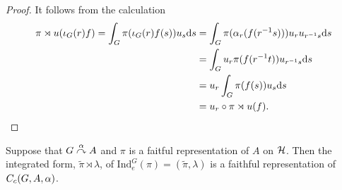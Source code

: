 \begin{proof}
It follows from the calculation
\begin{align*}
\pi \rtimes u (\iota_G(r)f) = \int_G \pi(\iota_G(r) f(s) ) u_s \mathrm{d} s &= \int_G \pi(\alpha_r(f(r^{-1}s))) u_ru_{r^{-1}s} \mathrm{d} s\\
&= \int_G u_r \pi(f(r^{-1}t)) u_{r^{-1}s} \mathrm{d} s \\
&= u_r \int_G  \pi(f(s)) u_s \mathrm{d} s \\
&= u_r \circ \pi \rtimes u (f).
\end{align*}
\end{proof}
\begin{lemma}
Suppose that $G \stackrel{\alpha}{\curvearrowright} A$ and $\pi$ is a faitful representation of $A$ on $\mathcal{H}$. Then the integrated form, $\tilde{\pi} \rtimes \lambda$, of $\mathrm{Ind}_e^G (\pi)=(\tilde \pi , \lambda)$ is a faithful representation of $C_c(G,A,\alpha)$.
\label{cross:regfaith}
\end{lemma}
